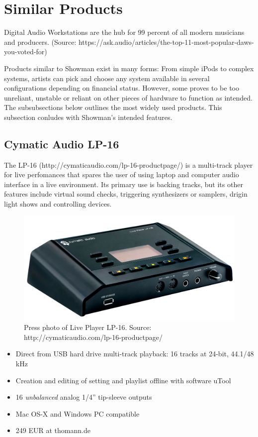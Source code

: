 \section{Similar Products}
Digital Audio Workstations are the hub for 99 percent of all modern musicians and producers. (Source: https://ask.audio/articles/the-top-11-most-popular-daws-you-voted-for) \newline

Products similar to Showman exist in many forms: From simple iPods to complex systems, artists can pick and choose any system available in several configurations depending on financial status. However, some proves to be too unreliant, unstable or reliant on other pieces of hardware to function as intended. The subsubsections below outlines the most widely used products. This subsection conludes with Showman's intended features. \\

\subsection{Cymatic Audio LP-16}
The LP-16 (http://cymaticaudio.com/lp-16-productpage/) is a multi-track player for live perfomances that spares the user of using laptop and computer audio interface in a live environment. Its primary use is backing tracks, but its other features include virtual sound checks, triggering synthesizers or samplers, drigin light shows and controlling devices. \\

\begin{figure}[H]
\centering
\includegraphics[scale=0.2]{./pictures/lp.png}
\caption{Press photo of Live Player LP-16. Source: http://cymaticaudio.com/lp-16-productpage/}
\label{fig:lp.png}
\end{figure}

\begin{itemize}
\item Direct from USB hard drive multi-track playback: 16 tracks at 24-bit, 44.1/48 kHz
\item Creation and editing of setting and playlist offline with software uTool
\item 16 \textit{unbalanced} analog 1/4'' tip-sleeve outputs
\item Mac OS-X and Windows PC compatible
\item 249 EUR at thomann.de
\end{itemize}

